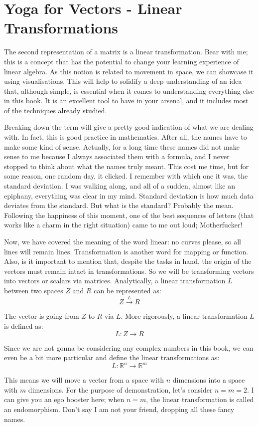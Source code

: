 \documentclass[a4,12pt,twosided,openany]{memoir}
\begin{document}
\section{Yoga for Vectors - Linear Transformations}
\par 
\indent
The second representation of a matrix is a linear transformation. Bear with me; this is a concept that has the potential to change your learning experience of linear algebra. As this notion is related to movement in space, we can showcase it using visualisations. This will help to solidify a deep understanding of an idea that, although simple, is essential when it comes to understanding everything else in this book. It is an excellent tool to have in your arsenal, and it includes most of the techniques already studied. 
\par 
\indent
Breaking down the term will give a pretty good indication of what we are dealing with. In fact, this is good practice in mathematics. After all, the names have to make some kind of sense. Actually, for a long time these names did not make sense to me because I always associated them with a formula, and I never stopped to think about what the names truly meant. This cost me time, but for some reason, one random day, it clicked. I remember with which one it was, the standard deviation. I was walking along, and all of a sudden, almost like an epiphany, everything was clear in my mind. Standard deviation is how much data deviates from the standard. But what is the standard? Probably the mean. Following the happiness of this moment, one of the best sequences of letters (that works like a charm in the right situation) came to me out loud; Motherfucker! 
\par 
\indent
Now, we have covered the meaning of the word linear: no curves please, so all lines will remain lines. Transformation is another word for mapping or function. Also, is it important to mention that, despite the tasks in hand, the origin of the vectors must remain intact in transformations. So we will be transforming vectors into vectors or scalars via matrices. Analytically, a linear transformation $L$ between two spaces $Z$ and $R$ can be represented as:
\[Z \stackrel{L}{\rightarrow} R\]
\par 
\indent
The vector is going from $Z$ to $R$ via $L$. More rigorously, a linear transformation $L$ is defined as:
\[L:Z \rightarrow R\]
\par 
\indent
Since we are not gonna be considering any complex numbers in this book, we can even be a bit more particular and define the linear transformations as:
\[L:\mathbb{R}^n \rightarrow \mathbb{R}^m\]
\par 
\indent
This means we will move a vector from a space with $n$ dimensions into a space with $m$ dimensions. For the purpose of demonstration, let’s consider $n=m=2$. I can give you an ego booster here; when $n=m$, the linear transformation is called an endomorphism. Don’t say I am not your friend, dropping all these fancy names.
\end{document}
